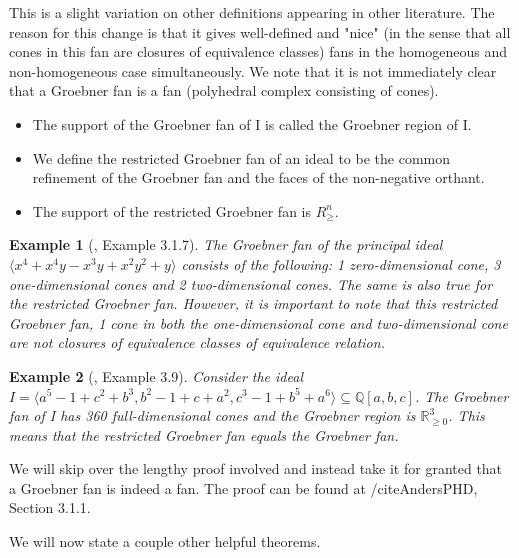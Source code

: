 \documentclass[12pt,a4paper]{report}
\newtheorem{example}{Example}
\begin{document}
This is a slight variation on other definitions appearing in other literature. The reason for this change is that it gives well-defined and "nice" (in the sense that all cones in this fan are closures of equivalence classes) fans in the homogeneous and non-homogeneous case simultaneously. We note that it is not immediately clear that a Groebner fan is a fan (polyhedral complex consisting of cones). 

\begin{itemize}
    \item The support of the Groebner fan of I is called the Groebner region of I.
    \item We define the restricted Groebner fan of an ideal to be the common refinement of the Groebner fan and the faces of the non-negative orthant.
    \item The support of the restricted Groebner fan is $R_{\geq} ^{n}$.
\end{itemize}



\begin{example}[\cite{AndersPHD}, Example 3.1.7]
The Groebner fan of the principal ideal $\langle x^4 + x^4 y - x^3 y + x^2 y^2 + y \rangle$ consists of the following: 1 zero-dimensional cone, 3 one-dimensional cones and 2 two-dimensional cones. The same is also true for the restricted Groebner fan. However, it is important to note that this restricted Groebner fan, 1 cone in both the one-dimensional cone and two-dimensional cone are not closures of equivalence classes of equivalence relation.
\end{example}

\begin{example}[\cite{BSturmfelz}, Example 3.9]

Consider the ideal $I = \langle a^5 - 1 + c^2 + b^3, b^2 - 1 + c + a^2, c^3 - 1 + b^5 + a^6 \rangle \subseteq \mathbb{Q} [a,b,c] $. The Groebner fan of I has 360 full-dimensional cones and the Groebner region is $\mathbb{R}_{\geq 0}^{3}$. This means that the restricted Groebner fan equals the Groebner fan. 
\end{example}

We will skip over the lengthy proof involved and instead take it for granted that a Groebner fan is indeed a fan. The proof can be found at /cite{AndersPHD}, Section 3.1.1.

We will now state a couple other helpful theorems.
\end{document}
